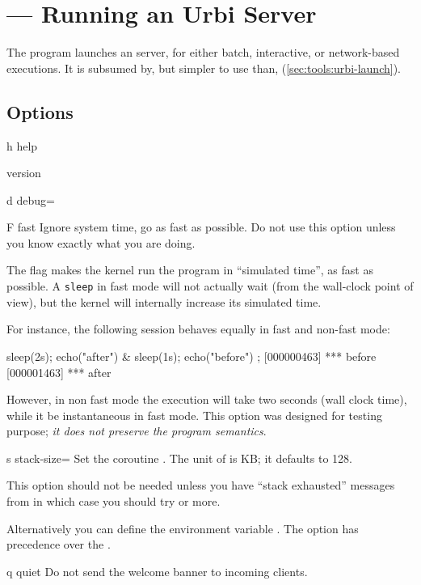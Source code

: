 \section{ --- Running an Urbi Server}
\label{sec:tools:urbi}

The  program launches an \urbi server, for either batch,
interactive, or network-based executions.  It is subsumed by, but
simpler to use than, 
(\autoref{sec:tools:urbi-launch}).

\subsection{Options}

\begin{options}
\item[h]{help} \optionHelp
\item{version} \optionVersion
\end{options}

\begin{options}[Tuning]
\item[d]{debug=} \optionDebug
\item[F]{fast}
  Ignore system time, go as fast as possible.  Do not use this option
  unless you know exactly what you are doing.

  The  flag makes the kernel run the program in
  ``simulated time'', as fast as possible. A \lstinline|sleep| in fast
  mode will not actually wait (from the wall-clock point of view), but
  the kernel will internally increase its simulated time.

  For instance, the following session behaves equally in fast and
  non-fast mode:

\begin{urbiscript}[firstnumber=1]
{ sleep(2s); echo("after") } & { sleep(1s); echo("before") };
[000000463] *** before
[000001463] *** after
\end{urbiscript}

  \noindent
  However, in non fast mode the execution will take two seconds (wall
  clock time), while it be instantaneous in fast mode. This option was
  designed for testing purpose; \emph{it does not preserve the program
    semantics}.

\item[s]{stack-size=} Set the coroutine .
  The unit of  is KB; it defaults to 128.

  This option should not be needed unless you have ``stack exhausted''
  messages from  in which case you should try
   or more.

  Alternatively you can define the environment variable
  .  The option  has
  precedence over the .

\item[q]{quiet} Do not send the welcome banner to incoming clients.
\end{options}

